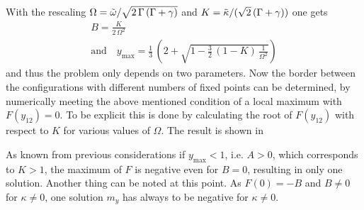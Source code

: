 With the rescaling $\Omega=\tilde{\omega}/\sqrt{2\,\Gamma\,(\Gamma+\gamma)}$ and $K=\tilde{\kappa}/(\sqrt{2}\,(\Gamma+\gamma))$ one gets
\begin{gather*}
    B=\frac{K}{2\,\Omega^2}\\\text{and}\quad
    y_\text{max}=\frac{1}{3}\,\left( 2+ \sqrt{1-\frac{3}{2}\,(1-K)\,\frac{1}{\Omega^2}}  \right)
\end{gather*}
and thus the problem only depends on two parameters. Now the border between the configurations with different numbers of fixed points can be determined, by numerically meeting the above mentioned condition of a local maximum with $F(y_{12})=0$. To be explicit this is done by calculating the root of $F(y_{12})$ with respect to $K$ for various values of $\Omega$. The result is shown in 

As known from previous considerations if $y_\text{max}<1$, i.e. $A>0$, which corresponds to $K>1$, the maximum of $F$ is negative even for $B=0$, resulting in only one solution. Another thing can be noted at this point. As $F(0)=-B$ and $B\neq0$ for $\kappa\neq0$, one solution $m_y$ has always to be negative for $\kappa\neq0$.\\\\

